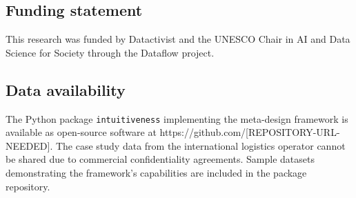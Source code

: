 \documentclass[Afour,times,sageh]{sagej}
\begin{document}
\subsection*{Funding statement}
This research was funded by Datactivist and the UNESCO Chair in AI and Data Science for Society through the Dataflow project.

\subsection*{Data availability}
The Python package \texttt{intuitiveness} implementing the meta-design framework is available as open-source software at https://github.com/[REPOSITORY-URL-NEEDED]. The case study data from the international logistics operator cannot be shared due to commercial confidentiality agreements. Sample datasets demonstrating the framework's capabilities are included in the package repository.
\end{document}
